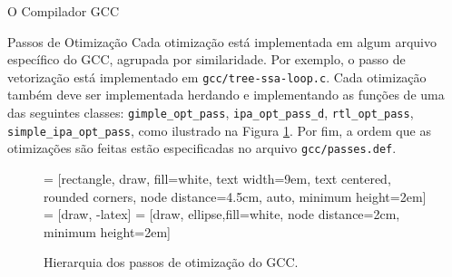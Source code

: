 \begin{section}{O Compilador GCC}
\begin{subsection}{Passos de Otimização}
    Cada otimização está implementada em algum arquivo específico do GCC,
agrupada por similaridade. Por exemplo, o passo de vetorização está implementado
em \texttt{gcc/tree-ssa-loop.c}. Cada otimização também deve ser implementada
    herdando e implementando as funções de uma das seguintes classes:
\texttt{gimple\_opt\_pass}, \texttt{ipa\_opt\_pass\_d}, \texttt{rtl\_opt\_pass},
    \texttt{simple\_ipa\_opt\_pass}, como ilustrado na Figura \ref{fig:opt_uml}.
Por fim, a ordem que as otimizações são feitas estão
especificadas no arquivo \texttt{gcc/passes.def}.

\begin{figure}
 = [rectangle, draw, fill=white,
    text width=9em, text centered, rounded corners, node distance=4.5cm, auto, minimum height=2em]
 = [draw, -latex]
 = [draw, ellipse,fill=white, node distance=2cm,
    minimum height=2em]
\begin{center}
\end{center}
\caption{Hierarquia dos passos de otimização do GCC.}
\label{fig:opt_uml}
\end{figure}


\end{subsection}


\end{section}
